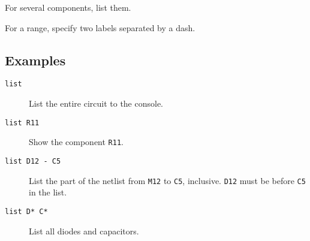 For several components, list them.

For a range, specify two labels separated by a dash.
\subsection{Examples}

\begin{description}

\item[{\tt list}] List the entire circuit to the console.

\item[{\tt list R11}] Show the component {\tt R11}.

\item[{\tt list D12 - C5}] List the part of the netlist from {\tt M12} to
{\tt C5}, inclusive.  {\tt D12} must be before {\tt C5} in the list.

\item[{\tt list D* C*}] List all diodes and capacitors.

\end{description}
